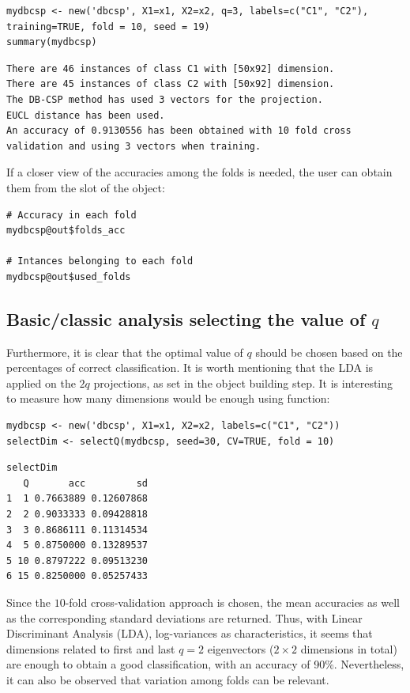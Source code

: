 \begin{verbatim}
mydbcsp <- new('dbcsp', X1=x1, X2=x2, q=3, labels=c("C1", "C2"), training=TRUE, fold = 10, seed = 19)
summary(mydbcsp)
\end{verbatim}
  
\begin{verbatim}
There are 46 instances of class C1 with [50x92] dimension.
There are 45 instances of class C2 with [50x92] dimension.
The DB-CSP method has used 3 vectors for the projection.
EUCL distance has been used.
An accuracy of 0.9130556 has been obtained with 10 fold cross validation and using 3 vectors when training.
\end{verbatim}

If a closer view of the accuracies  among the folds is needed, the user can obtain them from the  slot of the object:

\begin{verbatim}
# Accuracy in each fold
mydbcsp@out$folds_acc

# Intances belonging to each fold
mydbcsp@out$used_folds
\end{verbatim}


\subsection{Basic/classic analysis selecting the value of $q$}
 
Furthermore, it is clear that the optimal value of $q$ should be chosen based on the percentages of correct classification. It is worth mentioning that the LDA is applied on the $2q$ projections, as set in the object building step. It is interesting to measure how many dimensions would be enough using  function:
 

\begin{verbatim}
mydbcsp <- new('dbcsp', X1=x1, X2=x2, labels=c("C1", "C2"))
selectDim <- selectQ(mydbcsp, seed=30, CV=TRUE, fold = 10) 
\end{verbatim}

\begin{verbatim}
selectDim
   Q       acc         sd
1  1 0.7663889 0.12607868
2  2 0.9033333 0.09428818
3  3 0.8686111 0.11314534
4  5 0.8750000 0.13289537
5 10 0.8797222 0.09513230
6 15 0.8250000 0.05257433
\end{verbatim}

Since the $10$-fold cross-validation approach is chosen, the mean accuracies as well as the corresponding standard deviations are returned. Thus, with Linear Discriminant Analysis (LDA), log-variances as characteristics, it seems that dimensions related to first and last $q=2$ eigenvectors ($2\times 2$ dimensions in total) are enough to obtain a good classification, with an accuracy of 90\%. Nevertheless, it can also be observed that variation among folds can be relevant.


